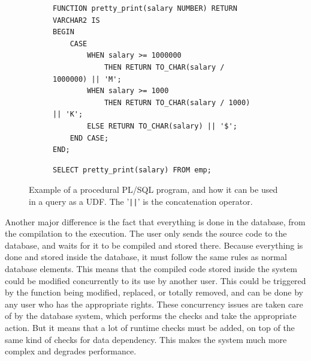 \documentclass[twoside,11pt,a4paper]{article}
\newcommand{\sql}[1]{\texttt{#1}}
\begin{document}
\begin{figure}[tb]
	\begin{subfigure}[h]{\textwidth}
		\begin{lstlisting}[style=PLSQL, frame=L]
FUNCTION pretty_print(salary NUMBER) RETURN VARCHAR2 IS
BEGIN
	CASE
		WHEN salary >= 1000000
			THEN RETURN TO_CHAR(salary / 1000000) || 'M';
		WHEN salary >= 1000
			THEN RETURN TO_CHAR(salary / 1000) || 'K';
		ELSE RETURN TO_CHAR(salary) || '$';
	END CASE;
END;
		\end{lstlisting}
	\end{subfigure}
	
	\begin{subfigure}[h]{\textwidth}
		\begin{lstlisting}[style=SQL]
SELECT pretty_print(salary) FROM emp;
		\end{lstlisting}
	\end{subfigure}
	
	\caption[Example of a procedural PL/SQL program, and how it can be used in a query as a UDF]{Example of a procedural PL/SQL program, and how it can be used in a query as a UDF. The '\sql{||}' is the concatenation operator.}
	\label{fig:plsudfexample}
\end{figure}

Another major difference is the fact that everything is done in the database, from the compilation to the execution. The user only sends the source code to the database, and waits for it to be compiled and stored there. Because everything is done and stored inside the database, it must follow the same rules as normal database elements. This means that the compiled code stored inside the system could be modified concurrently to its use by another user. This could be triggered by the function being modified, replaced, or totally removed, and can be done by any user who has the appropriate rights. These concurrency issues are taken care of by the database system, which performs the checks and take the appropriate action. But it means that a lot of runtime checks must be added, on top of the same kind of checks for data dependency. This makes the system much more complex and degrades performance.

\end{document}
